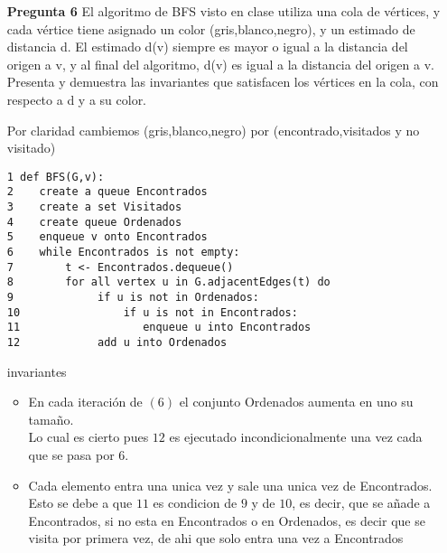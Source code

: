 \documentclass[12pt]{article}
\begin{document}
\lstset{language=python}
\begin{itemize}

\item[\bf{Pregunta 6}]El algoritmo de BFS visto en clase utiliza una cola de vértices, y cada vértice tiene asignado un color (gris,blanco,negro), y un estimado de distancia d. El estimado d(v) siempre es mayor o igual a la distancia del origen a v, y al final del algoritmo, d(v) es igual a la distancia del origen a v. Presenta y demuestra las invariantes que satisfacen los vértices en la cola, con respecto a d y a su color.

Por claridad cambiemos (gris,blanco,negro) por (encontrado,visitados y no visitado)
\begin{lstlisting}[frame=single] 
1 def BFS(G,v):
2    create a queue Encontrados
3    create a set Visitados
4    create queue Ordenados
5    enqueue v onto Encontrados
6    while Encontrados is not empty:
7        t <- Encontrados.dequeue()
8        for all vertex u in G.adjacentEdges(t) do
9             if u is not in Ordenados:
10                if u is not in Encontrados:
11                   enqueue u into Encontrados
12            add u into Ordenados
\end{lstlisting}

\item[invariantes]
  \begin{itemize}
 \item En cada iteración de $(6)$ el conjunto Ordenados aumenta en uno su tamaño.\\
   Lo cual es cierto pues $12$ es ejecutado incondicionalmente una vez cada que se pasa por $6$.
   \item Cada elemento entra una unica vez y sale una unica vez de Encontrados.\\
     Esto se debe a que $11$ es condicion de $9$ y de $10$, es decir, que se añade a Encontrados, si no esta en Encontrados o en Ordenados, es decir que se visita por primera vez, de ahi que solo entra una vez a Encontrados
   \end{itemize}

\end{itemize}
\end{document}
